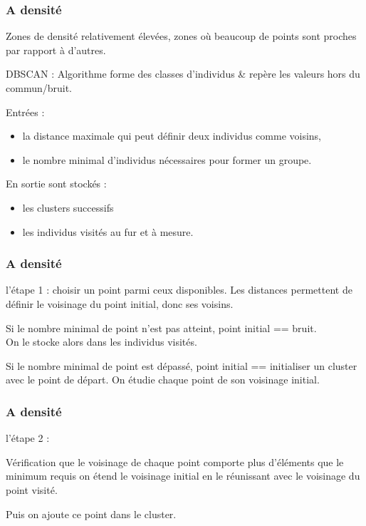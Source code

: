 \begin{frame}
  \frametitle{A densité}
 Zones de densité relativement élevées, zones où beaucoup de points sont proches par rapport à d’autres.

DBSCAN : Algorithme forme des classes d’individus \& repère les valeurs hors du commun/bruit. 

Entrées :
\begin{itemize}
\item la distance maximale qui peut définir deux individus comme voisins,
\item le nombre minimal d’individus nécessaires pour former un groupe.
\end{itemize}

En sortie sont stockés :
\begin{itemize}
\item les clusters successifs
\item les individus visités au fur et à mesure.
\end{itemize}

\end{frame}

\begin{frame}
  \frametitle{A densité}
l'étape 1 :
choisir un point parmi ceux disponibles. Les distances permettent de définir le voisinage du point initial, donc ses voisins. 

Si le nombre minimal de point n'est pas atteint, point initial == bruit. \\
On le stocke alors dans les individus visités.

Si le nombre minimal de point est dépassé, point initial == initialiser un cluster avec le point de départ. On étudie chaque point de son voisinage initial. \\
\end{frame}

\begin{frame}
  \frametitle{A densité}
l'étape 2 :

Vérification que le voisinage de chaque point comporte plus d'éléments que le minimum requis  on étend le voisinage initial en le réunissant avec le voisinage du point visité.

Puis on ajoute ce point dans le cluster. 
\end{frame}

